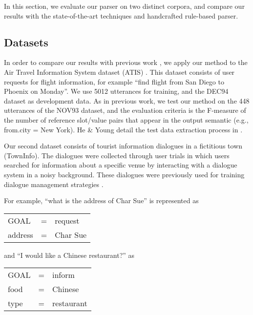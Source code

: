 \documentclass{article}
\begin{document}
In this section, we evaluate our parser on two distinct corpora, and compare our results with the state-of-the-art techniques and handcrafted rule-based parser. 

\subsection{Datasets}

In order to compare our results with previous work \cite{he06,zettlemoyer07,meza08b,mairesse09},
we apply our method to the Air Travel Information System dataset
(ATIS) \cite{atis94}. This dataset consists of user requests for flight information, for example ``find flight from San Diego to Phoenix on Monday''. We use 5012 utterances for training, and the DEC94 dataset as development data. As in previous work, we test our method on the 448 utterances of the NOV93 dataset, and the evaluation criteria is the F-measure of the number of reference slot/value pairs that appear in the output semantic (e.g., from.city = New York). He \& Young detail the test data extraction process in \cite{he05}.

Our second dataset consists of tourist information dialogues in a fictitious
town (TownInfo). The dialogues were collected through user
trials in which users searched for information about a specific venue
by interacting with a dialogue system in a noisy background. These
dialogues were previously used for training dialogue management
strategies \cite{williams07,thomson08}. 

For example, ``what is the address of Char Sue'' is represented as 

\vspace{.25cm}
\begin{tabular}{lll}
  GOAL          & = & request \\
  address       & = & Char Sue \\
\end{tabular} 
\vspace{.25cm}

and ``I would like a Chinese restaurant?'' as

\vspace{.25cm}
\begin{tabular}{lll}
  GOAL       & = & inform \\
  food       & = & Chinese \\
  type       & = & restaurant \\
\end{tabular} 
\vspace{.25cm}
\end{document}

